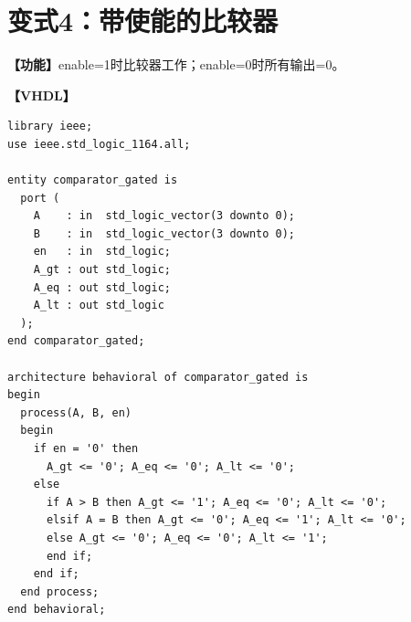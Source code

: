 \section{变式4：带使能的比较器}

\begin{detailbox}[完整教学]
\textbf{【功能】}enable=1时比较器工作；enable=0时所有输出=0。

\textbf{【VHDL】}
\begin{lstlisting}[caption={带使能的比较器}]
library ieee;
use ieee.std_logic_1164.all;

entity comparator_gated is
  port (
    A    : in  std_logic_vector(3 downto 0);
    B    : in  std_logic_vector(3 downto 0);
    en   : in  std_logic;
    A_gt : out std_logic;
    A_eq : out std_logic;
    A_lt : out std_logic
  );
end comparator_gated;

architecture behavioral of comparator_gated is
begin
  process(A, B, en)
  begin
    if en = '0' then
      A_gt <= '0'; A_eq <= '0'; A_lt <= '0';
    else
      if A > B then A_gt <= '1'; A_eq <= '0'; A_lt <= '0';
      elsif A = B then A_gt <= '0'; A_eq <= '1'; A_lt <= '0';
      else A_gt <= '0'; A_eq <= '0'; A_lt <= '1';
      end if;
    end if;
  end process;
end behavioral;
\end{lstlisting}
\end{detailbox}
